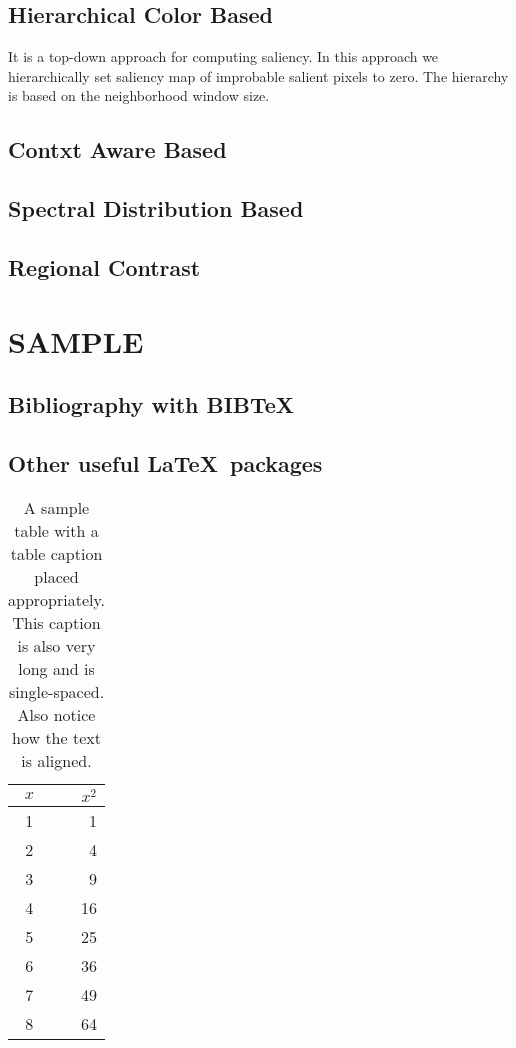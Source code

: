 \documentclass[MTech]{iitmdiss}
\begin{document}
\section{Hierarchical Color Based}
It is a top-down approach for computing saliency. In this approach we hierarchically set saliency map of improbable salient pixels to zero. The hierarchy is based on the neighborhood window size. 

\section{Contxt Aware Based}
\section{Spectral Distribution Based}
\section{Regional Contrast}





\chapter{SAMPLE} 
 \section{Bibliography with BIB\TeX} 
 \section{Other useful \LaTeX\ packages}

 
 \begin{table}[htbp]
   \caption{A sample table with a table caption placed
     appropriately. This caption is also very long and is
     single-spaced.  Also notice how the text is aligned.}
   \begin{center}
   \begin{tabular}[c]{|c|r|} \hline
     $x$ & $x^2$ \\ \hline
     1  &  1   \\
     2  &  4  \\
     3  &  9  \\
     4  &  16  \\
     5  &  25  \\
     6  &  36  \\
     7  &  49  \\
     8  &  64  \\ \hline
   \end{tabular}
   \label{tab:sample}
   \end{center}
 \end{table}
\end{document}
